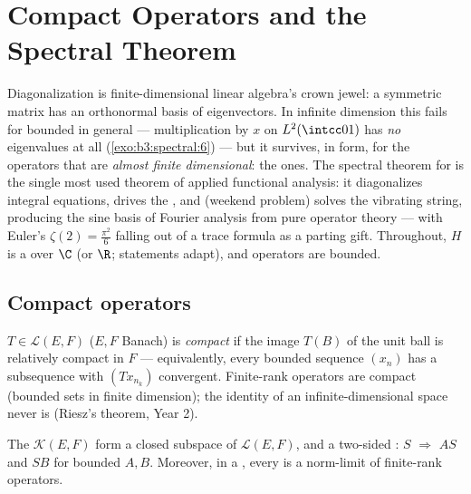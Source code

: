 \chapter{Compact Operators and the Spectral Theorem}
\label{ch:b3:spectral}

Diagonalization is finite-dimensional linear algebra's crown
jewel: a symmetric matrix has an orthonormal basis of
eigenvectors. In infinite dimension this fails for bounded
 in general --- multiplication by $x$ on
$L^2(\intcc01)$ has \emph{no} eigenvalues at all
(\cref{exo:b3:spectral:6}) --- but it survives, in 
form, for the operators that are \emph{almost finite
dimensional}: the  ones. The spectral theorem for
  is the single most used theorem
of applied functional analysis: it diagonalizes integral
equations, drives the , and (weekend
problem) solves the vibrating string, producing the sine basis
of Fourier analysis from pure operator theory --- with Euler's
$\zeta(2) = \frac{\pi^2}6$ falling out of a trace formula as a
parting gift. Throughout, $H$ is a  over $\C$ (or
$\R$; statements adapt), and operators are bounded.

\section{Compact operators}

\begin{definition}\label{def:b3:spectral:compact}
$T \in \mathcal L(E, F)$ ($E, F$ Banach) is
\emph{compact} if the image $T(B)$ of
the unit ball is relatively compact in $F$ --- equivalently,
every bounded sequence $(x_n)$ has a subsequence with
$(Tx_{n_k})$ convergent. Finite-rank operators are compact
(bounded sets in finite dimension); the identity of an
infinite-dimensional space never is (Riesz's theorem, Year 2).
\end{definition}

\begin{proposition}\label{prop:b3:spectral:ideal}
The  $\mathcal K(E, F)$ form a closed subspace
of $\mathcal L(E, F)$, and a two-sided : $S$ 
$\Rightarrow$ $AS$ and $SB$  for bounded $A, B$.
Moreover, in a , every  is a
norm-limit of finite-rank operators.
\end{proposition}

